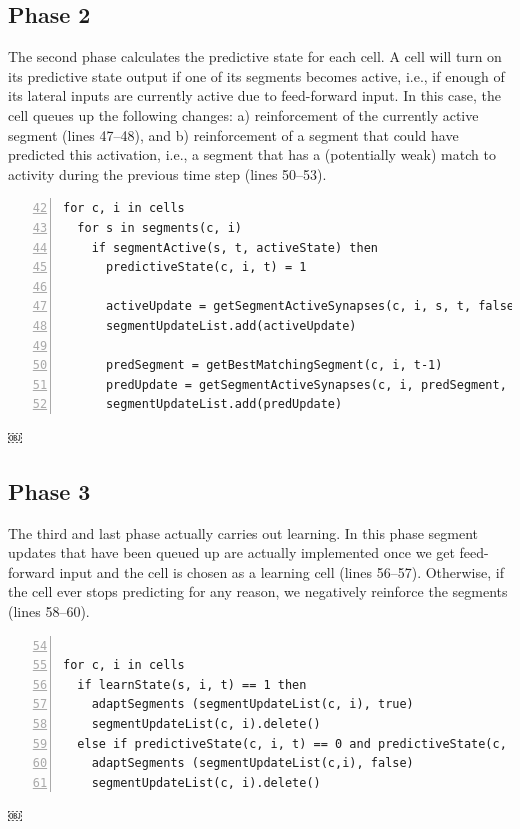 \documentclass{report}
\begin{document}
\subsection*{Phase 2}

The second phase calculates the predictive state for each cell. A cell
will turn on its predictive state output if one of its segments
becomes active, i.e., if enough of its lateral inputs are currently
active due to feed-forward input. In this case, the cell queues up the
following changes: a) reinforcement of the currently active segment
(lines 47--48), and b) reinforcement of a segment that could have
predicted this activation, i.e., a segment that has a (potentially
weak) match to activity during the previous time step (lines 50--53).

\begin{lstlisting}[numbers=left,firstnumber=42]
for c, i in cells
  for s in segments(c, i)
    if segmentActive(s, t, activeState) then
      predictiveState(c, i, t) = 1

      activeUpdate = getSegmentActiveSynapses(c, i, s, t, false)
      segmentUpdateList.add(activeUpdate)

      predSegment = getBestMatchingSegment(c, i, t-1)
      predUpdate = getSegmentActiveSynapses(c, i, predSegment, t-1, true)
      segmentUpdateList.add(predUpdate)
\end{lstlisting}
￼
\subsection*{Phase 3}

The third and last phase actually carries out learning. In this phase
segment updates that have been queued up are actually implemented once
we get feed-forward input and the cell is chosen as a learning cell
(lines 56--57). Otherwise, if the cell ever stops predicting for any
reason, we negatively reinforce the segments (lines 58--60).

\begin{lstlisting}[numbers=left,firstnumber=54]￼
for c, i in cells
  if learnState(s, i, t) == 1 then
    adaptSegments (segmentUpdateList(c, i), true)
    segmentUpdateList(c, i).delete()
  else if predictiveState(c, i, t) == 0 and predictiveState(c, i, t-1)==1 then
    adaptSegments (segmentUpdateList(c,i), false)
    segmentUpdateList(c, i).delete()
\end{lstlisting}￼
\end{document}
